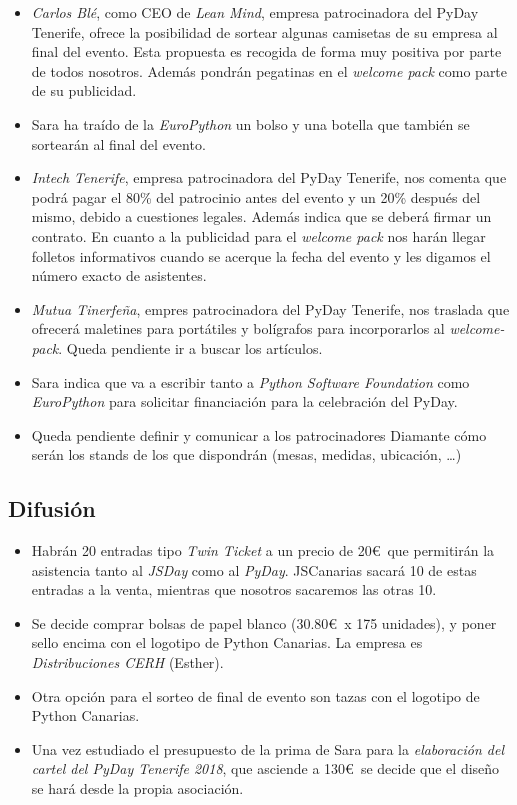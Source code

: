 \documentclass[a4paper, 12pt]{article}
\begin{document}
    \begin{itemize}
        \item \textit{Carlos Blé}, como CEO de \textit{Lean Mind}, empresa patrocinadora del PyDay Tenerife, ofrece la posibilidad de sortear algunas camisetas de su empresa al final del evento. Esta propuesta es recogida de forma muy positiva por parte de todos nosotros. Además pondrán pegatinas en el \textit{welcome pack} como parte de su publicidad.
        \item Sara ha traído de la \textit{EuroPython} un bolso y una botella que también se sortearán al final del evento.
        \item \textit{Intech Tenerife}, empresa patrocinadora del PyDay Tenerife, nos comenta que podrá pagar el 80\% del patrocinio antes del evento y un 20\% después del mismo, debido a cuestiones legales. Además indica que se deberá firmar un contrato. En cuanto a la publicidad para el \textit{welcome pack} nos harán llegar folletos informativos cuando se acerque la fecha del evento y les digamos el número exacto de asistentes.
        \item \textit{Mutua Tinerfeña}, empres patrocinadora del PyDay Tenerife, nos traslada que ofrecerá maletines para portátiles y bolígrafos para incorporarlos al \textit{welcome-pack}. Queda pendiente ir a buscar los artículos.
        \item Sara indica que va a escribir tanto a \textit{Python Software Foundation} como \textit{EuroPython} para solicitar financiación para la celebración del PyDay.
        \item Queda pendiente definir y comunicar a los patrocinadores Diamante cómo serán los stands de los que dispondrán (mesas, medidas, ubicación, \ldots)
    \end{itemize}

    \subsection*{Difusión}

    \begin{itemize}
        \item Habrán 20 entradas tipo \textit{Twin Ticket} a un precio de 20\euro\ que permitirán la asistencia tanto al \textit{JSDay} como al \textit{PyDay}. JSCanarias sacará 10 de estas entradas a la venta, mientras que nosotros sacaremos las otras 10.
        \item Se decide comprar bolsas de papel blanco (30.80\euro\ x 175 unidades), y poner sello encima con el logotipo de Python Canarias. La empresa es \textit{Distribuciones CERH} (Esther).
        \item Otra opción para el sorteo de final de evento son tazas con el logotipo de Python Canarias.
        \item Una vez estudiado el presupuesto de la prima de Sara para la \textit{elaboración del cartel del PyDay Tenerife 2018}, que asciende a 130\euro\ se decide que el diseño se hará desde la propia asociación.
    \end{itemize}
\end{document}
